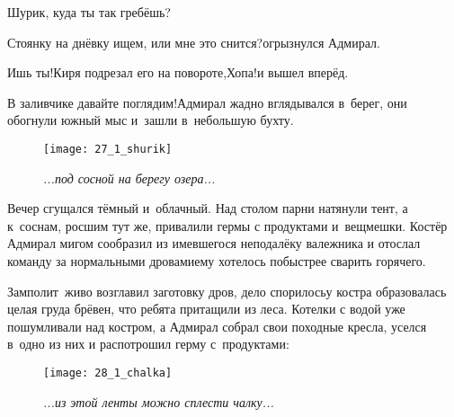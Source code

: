 \diagdash Шурик, куда ты так гребёшь?%

\diagdash Стоянку на днёвку ищем, или мне это снится?\mdash огрызнулся Адмирал.

\diagdash Ишь ты!\mdash Киря подрезал его на повороте,\mdash Хопа!\mdash и вышел вперёд.

\diagdash В заливчике давайте поглядим!\mdash Адмирал жадно вглядывался в~берег, они обогнули южный мыс и~зашли в~небольшую бухту.

\newpage

\begin{wrapfigure}[23]{l}{0.6\textwidth}
	\centering
	\texttt{[image: 27\_1\_shurik]}
	\caption{\small\textit{...под сосной на берегу озера...}}
\end{wrapfigure}

Вечер сгущался тёмный и~облачный. 
Над столом парни натянули тент, а к~соснам, росшим тут же, привалили гермы с продуктами и~вещмешки. 
Костёр Адмирал мигом сообразил из имевшегося неподалёку валежника и отослал команду за нормальными дровами\mdash ему хотелось побыстрее сварить горячего.

Замполит~живо возглавил заготовку дров, дело спорилось\mdash у костра образовалась целая груда брёвен, что ребята притащили из леса. Котелки с водой уже пошумливали над костром, а Адмирал собрал свои походные кресла, уселся в~одно из них и распотрошил герму с~продуктами:

\newpage

\begin{figure}[h]
	\centering
	\texttt{[image: 28\_1\_chalka]}
	\caption{\small\textit{...из этой ленты можно сплести чалку...}}
\end{figure}

\newpage

